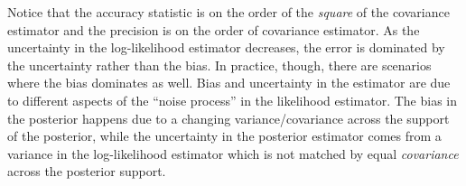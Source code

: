 \documentclass[%
 reprint,
 amsmath,amssymb,
 aps,nofootinbib,nobibnotes,onecolumn,prd
]{revtex4-2}
\newcommand{\rednote}[1]{{\color{Red} #1}}
\begin{document}
Notice that the accuracy statistic is on the order of the \textit{square} of the covariance estimator and the precision is on the order of covariance estimator. As the uncertainty in the log-likelihood estimator decreases, the error is dominated by the uncertainty rather than the bias. In practice, though, there are scenarios where the bias dominates as well. Bias and uncertainty in the estimator are due to different aspects of the ``noise process'' in the likelihood estimator. The bias in the posterior happens due to a changing variance/covariance across the support of the posterior, while the uncertainty in the posterior estimator comes from a variance in the log-likelihood estimator which is not matched by equal \textit{covariance} across the posterior support.




\end{document}
